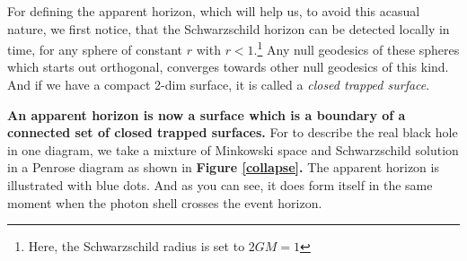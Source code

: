 	For defining the apparent horizon, which will help us, to avoid this acasual nature, we first notice, that the Schwarzschild horizon can be detected locally in time, for any sphere of constant $r$ with $r<1$.\footnote{Here, the Schwarzschild radius is set to $2GM=1$}
	Any null geodesics of these spheres which starts out orthogonal, converges towards other null geodesics of this kind. And if we have a compact 2-dim surface, it is called a \textit{closed trapped surface}.
	
	\textbf{An apparent horizon is now a surface which is a boundary of a connected set of closed trapped surfaces.}
	For to describe the real black hole in one diagram, we take a mixture of Minkowski space and Schwarzschild solution in a Penrose diagram as shown in \textbf{Figure \ref{collapse}.} The apparent horizon is illustrated with blue dots. And as you can see, it does form itself in the same moment when the photon shell crosses the event horizon.
				
